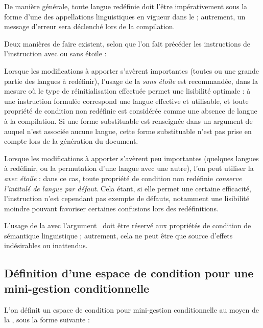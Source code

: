 \documentclass{article}
\begin{document}
De manière générale, toute langue redéfinie doit l'être impérativement sous la forme d'une des appellations linguistiques en vigueur dans le  ; autrement, un message d'erreur sera déclenché lors de la compilation.

Deux manières de faire existent, selon que l'on fait précéder les instructions  de l'instruction  avec ou sans étoile :

Lorsque les modifications à apporter s'avèrent importantes (toutes ou une grande partie des langues à redéfinir), l'usage de la  \emph{sans étoile} est recommandée, dans la mesure où le type de réinitialisation effectuée permet une lisibilité optimale : à une instruction  formulée correspond une langue effective et utilisable, et toute propriété de condition non redéfinie est considérée comme une absence de langue à la compilation. Si une forme substituable est renseignée dans un argument de  auquel n'est associée aucune langue, cette forme substituable n'est pas prise en compte lors de la génération du document.

Lorsque les modifications à apporter s'avèrent peu importantes (quelques langues à redéfinir, ou la permutation d'une langue avec une autre), l'on peut utiliser la  \emph{avec étoile} : dans ce cas, toute propriété de condition non redéfinie \emph{conserve l'intitulé de langue par défaut}. Cela étant, si elle permet une certaine efficacité, l'instruction  n'est cependant pas exempte de défauts, notamment une lisibilité moindre pouvant favoriser certaines confusions lors des redéfinitions.

L'usage de la  avec l'argument~\val{*} doit être réservé aux propriétés de condition de sémantique linguistique ; autrement, cela ne peut être que source d'effets indésirables ou inattendus.

\subsection{Définition d'une espace de condition pour une mini-gestion conditionnelle}\label{CtDoc_Commandes_SetMiniCondiSpace}
L'on définit un espace de condition pour mini-gestion conditionnelle au moyen de la , sous la forme suivante :

\end{document}
